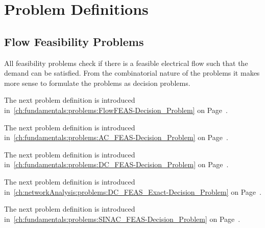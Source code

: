 \chapter{Problem Definitions}
\label{app:problems}
\newcommand\gapsizeProblems{\vspace{0.5cm}}
\section{Flow Feasibility Problems}
\label{app:problems:flow-feasibility-problems}
% 
All feasibility problems check if there is a feasible electrical flow such that
the demand can be satisfied. From the combinatorial nature of the problems it
makes more sense to formulate the problems as decision problems.

The next problem definition is introduced 
in~\cref{ch:fundamentals:problems:FlowFEAS-Decision_Problem}
on Page~\pageref{ch:fundamentals:problems:FlowFEAS-Decision_Problem}.
% 


\gapsizeProblems
The next problem definition is introduced 
in~\cref{ch:fundamentals:problems:AC_FEAS-Decision_Problem} on
Page~\pageref{ch:fundamentals:problems:AC_FEAS-Decision_Problem}.
% 


\gapsizeProblems
The next problem definition is introduced 
in~\cref{ch:fundamentals:problems:DC_FEAS-Decision_Problem} on
Page~\pageref{ch:fundamentals:problems:DC_FEAS-Decision_Problem}.
% 


\gapsizeProblems
The next problem definition is introduced 
in~\cref{ch:networkAnalysis:problems:DC_FEAS_Exact-Decision_Problem} on
Page~\pageref{ch:networkAnalysis:problems:DC_FEAS_Exact-Decision_Problem}.
% 


\gapsizeProblems
The next problem definition is introduced 
in~\cref{ch:fundamentals:problems:SINAC_FEAS-Decision_Problem} on
Page~\pageref{ch:fundamentals:problems:SINAC_FEAS-Decision_Problem}.
% 


